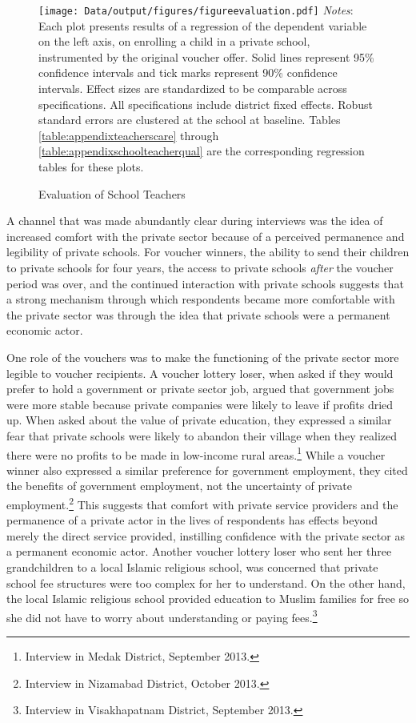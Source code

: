 \documentclass[hidelinks, 12pt, titlepage]{article}
\begin{document}
		\begin{figure}[htbp]
			\caption{Evaluation of School Teachers\label{fig:evaluation}}
			\centering
			\begin{minipage}{5.5in}
				\texttt{[image: Data/output/figures/figureevaluation.pdf]}
				\footnotesize
				\emph{Notes}: Each plot presents results of a regression of the dependent variable on the left axis, on enrolling a child in a private school, instrumented by the original voucher offer.  Solid lines represent 95\% confidence intervals and tick marks represent 90\% confidence intervals.  Effect sizes are standardized to be comparable across specifications.  All specifications include district fixed effects.  Robust standard errors are clustered at the school at baseline. Tables \ref{table:appendixteacherscare} through \ref{table:appendixschoolteacherqual} are the corresponding regression tables for these plots.
			\end{minipage}
		\end{figure}

		A channel that was made abundantly clear during interviews was the idea of increased comfort with the private sector because of a perceived permanence and legibility of private schools.  For voucher winners, the ability to send their children to private schools for four years, the access to private schools \emph{after} the voucher period was over, and the continued interaction with private schools suggests that a strong mechanism through which respondents became more comfortable with the private sector was through the idea that private schools were a permanent economic actor.

		One role of the vouchers was to make the functioning of the private sector more legible to voucher recipients.  A voucher lottery loser, when asked if they would prefer to hold a government or private sector job, argued that government jobs were more stable because private companies were likely to leave if profits dried up.  When asked about the value of private education, they expressed a similar fear that private schools were likely to abandon their village when they realized there were no profits to be made in low-income rural areas.\footnote{Interview in Medak District, September 2013.}  While a voucher winner also expressed a similar preference for government employment, they cited the benefits of government employment, not the uncertainty of private employment.\footnote{Interview in Nizamabad District, October 2013.}  This suggests that comfort with private service providers and the permanence of a private actor in the lives of respondents has effects beyond merely the direct service provided, instilling confidence with the private sector as a permanent economic actor.  Another voucher lottery loser who sent her three grandchildren to a local Islamic religious school, was concerned that private school fee structures were too complex for her to understand.  On the other hand, the local Islamic religious school provided education to Muslim families for free so she did not have to worry about understanding or paying fees.\footnote{Interview in Visakhapatnam District, September 2013.}
\end{document}
